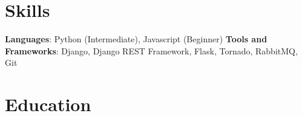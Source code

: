 \documentclass[11pt, a4paper, sans]{moderncv} %
\begin{document}
\section{Skills}
{\textbf{Languages}}: {Python (Intermediate), Javascript (Beginner)} \newline
{\textbf{Tools and Frameworks}}: {Django, Django REST Framework, Flask, Tornado, RabbitMQ, Git}

\section{Education}

\clearpage
\end{document}
